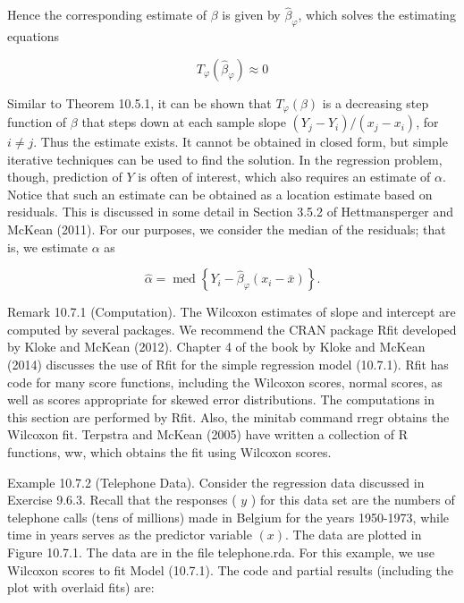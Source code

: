 Hence the corresponding estimate of $\beta$ is given by $\widehat{\beta}_{\varphi}$, which solves the estimating equations


\begin{equation*}
T_{\varphi}\left(\widehat{\beta}_{\varphi}\right) \approx 0 \tag{10.7.8}
\end{equation*}


Similar to Theorem 10.5.1, it can be shown that $T_{\varphi}(\beta)$ is a decreasing step function of $\beta$ that steps down at each sample slope $\left(Y_{j}-Y_{i}\right) /\left(x_{j}-x_{i}\right)$, for $i \neq j$. Thus the estimate exists. It cannot be obtained in closed form, but simple iterative techniques can be used to find the solution. In the regression problem, though, prediction of $Y$ is often of interest, which also requires an estimate of $\alpha$. Notice that such an estimate can be obtained as a location estimate based on residuals. This is discussed in some detail in Section 3.5.2 of Hettmansperger and McKean (2011). For our purposes, we consider the median of the residuals; that is, we estimate $\alpha$ as


\begin{equation*}
\widehat{\alpha}=\operatorname{med}\left\{Y_{i}-\widehat{\beta}_{\varphi}\left(x_{i}-\bar{x}\right)\right\} . \tag{10.7.9}
\end{equation*}


Remark 10.7.1 (Computation). The Wilcoxon estimates of slope and intercept are computed by several packages. We recommend the CRAN package Rfit developed by Kloke and McKean (2012). Chapter 4 of the book by Kloke and McKean (2014) discusses the use of Rfit for the simple regression model (10.7.1). Rfit has code for many score functions, including the Wilcoxon scores, normal scores, as well as scores appropriate for skewed error distributions. The computations in this section are performed by Rfit. Also, the minitab command rregr obtains the Wilcoxon fit. Terpstra and McKean (2005) have written a collection of R functions, ww, which obtains the fit using Wilcoxon scores.

Example 10.7.2 (Telephone Data). Consider the regression data discussed in Exercise 9.6.3. Recall that the responses ( $y$ ) for this data set are the numbers of telephone calls (tens of millions) made in Belgium for the years 1950-1973, while time in years serves as the predictor variable $(x)$. The data are plotted in Figure 10.7.1. The data are in the file telephone.rda. For this example, we use Wilcoxon scores to fit Model (10.7.1). The code and partial results (including the plot with overlaid fits) are:

